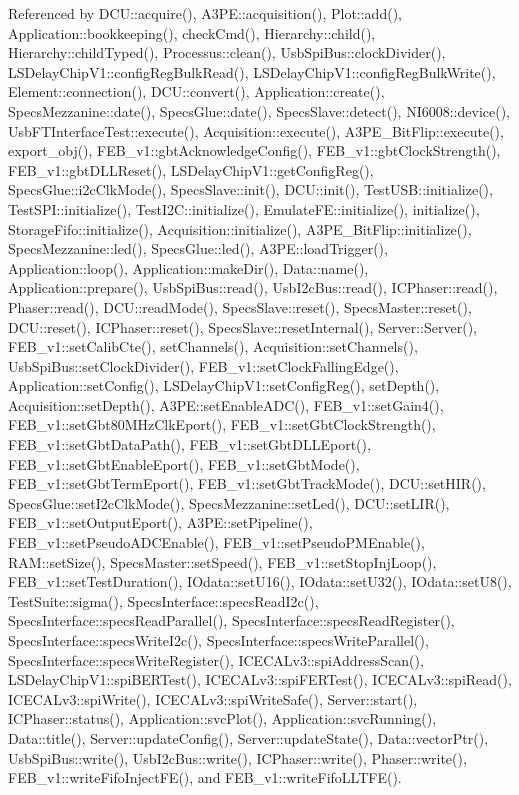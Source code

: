 Referenced by DCU::acquire(), A3PE::acquisition(), Plot::add(), Application::bookkeeping(), checkCmd(), Hierarchy::child(), Hierarchy::childTyped(), Processus::clean(), UsbSpiBus::clockDivider(), LSDelayChipV1::configRegBulkRead(), LSDelayChipV1::configRegBulkWrite(), Element::connection(), DCU::convert(), Application::create(), SpecsMezzanine::date(), SpecsGlue::date(), SpecsSlave::detect(), NI6008::device(), UsbFTInterfaceTest::execute(), Acquisition::execute(), A3PE\_\-BitFlip::execute(), export\_\-obj(), FEB\_\-v1::gbtAcknowledgeConfig(), FEB\_\-v1::gbtClockStrength(), FEB\_\-v1::gbtDLLReset(), LSDelayChipV1::getConfigReg(), SpecsGlue::i2cClkMode(), SpecsSlave::init(), DCU::init(), TestUSB::initialize(), TestSPI::initialize(), TestI2C::initialize(), EmulateFE::initialize(), initialize(), StorageFifo::initialize(), Acquisition::initialize(), A3PE\_\-BitFlip::initialize(), SpecsMezzanine::led(), SpecsGlue::led(), A3PE::loadTrigger(), Application::loop(), Application::makeDir(), Data::name(), Application::prepare(), UsbSpiBus::read(), UsbI2cBus::read(), ICPhaser::read(), Phaser::read(), DCU::readMode(), SpecsSlave::reset(), SpecsMaster::reset(), DCU::reset(), ICPhaser::reset(), SpecsSlave::resetInternal(), Server::Server(), FEB\_\-v1::setCalibCte(), setChannels(), Acquisition::setChannels(), UsbSpiBus::setClockDivider(), FEB\_\-v1::setClockFallingEdge(), Application::setConfig(), LSDelayChipV1::setConfigReg(), setDepth(), Acquisition::setDepth(), A3PE::setEnableADC(), FEB\_\-v1::setGain4(), FEB\_\-v1::setGbt80MHzClkEport(), FEB\_\-v1::setGbtClockStrength(), FEB\_\-v1::setGbtDataPath(), FEB\_\-v1::setGbtDLLEport(), FEB\_\-v1::setGbtEnableEport(), FEB\_\-v1::setGbtMode(), FEB\_\-v1::setGbtTermEport(), FEB\_\-v1::setGbtTrackMode(), DCU::setHIR(), SpecsGlue::setI2cClkMode(), SpecsMezzanine::setLed(), DCU::setLIR(), FEB\_\-v1::setOutputEport(), A3PE::setPipeline(), FEB\_\-v1::setPseudoADCEnable(), FEB\_\-v1::setPseudoPMEnable(), RAM::setSize(), SpecsMaster::setSpeed(), FEB\_\-v1::setStopInjLoop(), FEB\_\-v1::setTestDuration(), IOdata::setU16(), IOdata::setU32(), IOdata::setU8(), TestSuite::sigma(), SpecsInterface::specsReadI2c(), SpecsInterface::specsReadParallel(), SpecsInterface::specsReadRegister(), SpecsInterface::specsWriteI2c(), SpecsInterface::specsWriteParallel(), SpecsInterface::specsWriteRegister(), ICECALv3::spiAddressScan(), LSDelayChipV1::spiBERTest(), ICECALv3::spiFERTest(), ICECALv3::spiRead(), ICECALv3::spiWrite(), ICECALv3::spiWriteSafe(), Server::start(), ICPhaser::status(), Application::svcPlot(), Application::svcRunning(), Data::title(), Server::updateConfig(), Server::updateState(), Data::vectorPtr(), UsbSpiBus::write(), UsbI2cBus::write(), ICPhaser::write(), Phaser::write(), FEB\_\-v1::writeFifoInjectFE(), and FEB\_\-v1::writeFifoLLTFE().


